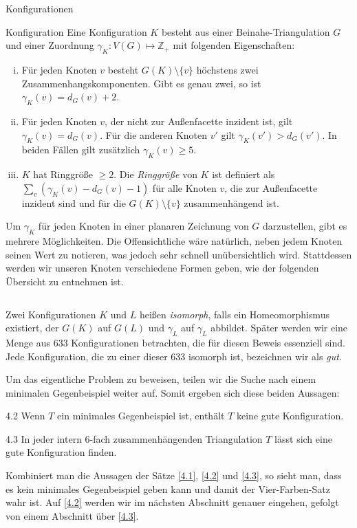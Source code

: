 \begin{section}{Konfigurationen}
 \begin{definition}{Konfiguration}
  Eine Konfiguration $K$ besteht aus einer Beinahe-Triangulation $G$ und einer Zuordnung $\gamma_K : V(G) \mapsto \mathbb{Z}_+$ mit folgenden Eigenschaften:
  \begin{enumerate}[i)]
   \item Für jeden Knoten $v$ besteht $G(K) \setminus \{v\}$ höchstens zwei Zusammenhangskomponenten. Gibt es genau zwei, so ist $\gamma_K(v) = d_G(v) + 2$.
   \item Für jeden Knoten $v$, der nicht zur Außenfacette inzident ist, gilt $\gamma_K(v) = d_G(v)$. Für die anderen Knoten $v'$ gilt $\gamma_K(v') > d_G(v')$. In beiden Fällen gilt zusätzlich $\gamma_K(v) \geq 5$.
   \item $K$ hat Ringgröße $\geq 2$. Die \textit{Ringgröße} von $K$ ist definiert als $\sum_v (\gamma_K(v) - d_G(v) - 1)$ für alle Knoten $v$, die zur Außenfacette inzident sind und für die $G(K) \setminus \{v\}$ zusammenhängend ist.
  \end{enumerate}
 \end{definition}
 
 Um $\gamma_K$ für jeden Knoten in einer planaren Zeichnung von $G$ darzustellen, gibt es mehrere Möglichkeiten. Die Offensichtliche wäre natürlich, neben jedem Knoten seinen Wert zu notieren, was jedoch sehr schnell unübersichtlich wird. Stattdessen werden wir unseren Knoten verschiedene Formen geben, wie der folgenden Übersicht zu entnehmen ist.
 
 \[ \]
 
 Zwei Konfigurationen $K$ und $L$ heißen \textit{isomorph}, falls ein Homeomorphismus existiert, der $G(K)$ auf $G(L)$ und $\gamma_L$ auf $\gamma_L$ abbildet. Später werden wir eine Menge aus 633 Konfigurationen betrachten, die für diesen Beweis essenziell sind. Jede Konfiguration, die zu einer dieser 633 isomorph ist, bezeichnen wir als \textit{gut}. 
   
 Um das eigentliche Problem zu beweisen, teilen wir die Suche nach einem minimalen Gegenbeispiel weiter auf. Somit ergeben sich diese beiden Aussagen:
   
 \begin{satzl}{}{4.2}
  Wenn $T$ ein minimales Gegenbeispiel ist, enthält $T$ keine gute Konfiguration.
 \end{satzl}
   
 \begin{satzl}{}{4.3}
  In jeder intern 6-fach zusammenhängenden Triangulation $T$ lässt sich eine gute Konfiguration finden.
 \end{satzl}
   
 Kombiniert man die Aussagen der Sätze \ref{4.1}, \ref{4.2} und \ref{4.3}, so sieht man, dass es kein minimales Gegenbeispiel geben kann und damit der Vier-Farben-Satz wahr ist. Auf \ref{4.2} werden wir im nächsten Abschnitt genauer eingehen, gefolgt von einem Abschnitt über \ref{4.3}. 
\end{section}